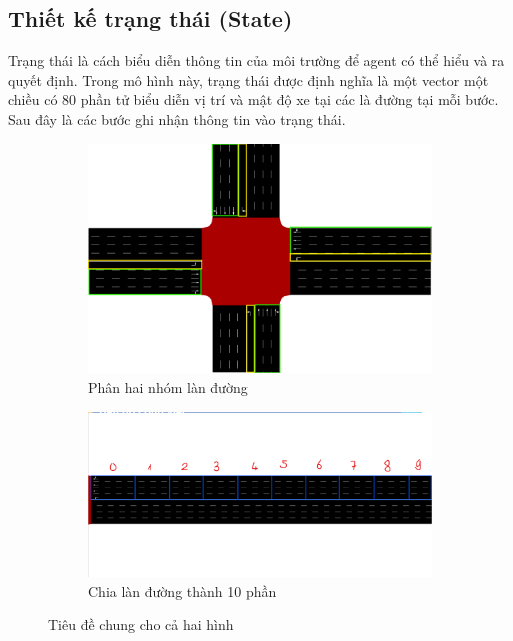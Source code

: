 \subsection{Thiết kế trạng thái (State)}
Trạng thái là cách biểu diễn thông tin của môi trường để agent có thể hiểu và ra quyết định. Trong mô hình này, trạng thái được định nghĩa là một vector một chiều có 80 phần tử biểu diễn vị trí và mật độ xe tại các là đường tại mỗi bước. Sau đây là các bước ghi nhận thông tin vào trạng thái.

\begin{figure}[!htp]
    \centering
    \begin{subfigure}[b]{0.45\textwidth}
        \includegraphics[width=\textwidth]{img/sumo_state_1.png}
        \caption{Phân hai nhóm làn đường}
        \label{fig:sumo_state_1}
    \end{subfigure}
    \hfill
    \begin{subfigure}[b]{0.45\textwidth}
        \includegraphics[width=\textwidth]{img/sumo_state_2.png}
        \caption{Chia làn đường thành 10 phần}
        \label{fig:sumo_state_2}
    \end{subfigure}
    \caption{Tiêu đề chung cho cả hai hình}
    \label{fig:sumo_state}
\end{figure}

